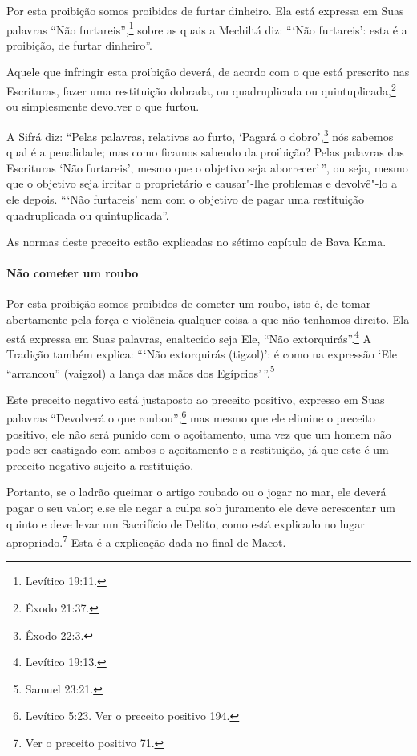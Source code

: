 \begin{multicols}{2}
Por esta proibição somos proibidos de furtar dinheiro. Ela está
expressa em Suas palavras ``Não furtareis'',\footnote{Levítico 19:11.} sobre as
quais a Mechiltá\starr{} diz: ```Não furtareis': esta é a proibição, de furtar
dinheiro''.

Aquele que infringir esta proibição deverá, de acordo com o que está
prescrito nas Escrituras, fazer uma restituição dobrada, ou
quadruplicada ou quintuplicada,\footnote{Êxodo 21:37.} ou simplesmente
devolver o que furtou.

A Sifrá\starr{} diz: ``Pelas palavras, relativas ao furto, `Pagará o dobro',\footnote{Êxodo 22:3.} nós sabemos qual é a penalidade; mas como ficamos sabendo
da proibição? Pelas palavras das Escrituras `Não furtareis', mesmo que
o objetivo seja aborrecer'\,'', ou seja, mesmo que o objetivo seja irritar
o proprietário e causar"-lhe problemas e devolvê"-lo a ele depois. ```Não
furtareis' nem com o objetivo de pagar uma restituição quadruplicada ou
quintuplicada''.

As normas deste preceito estão explicadas no sétimo capítulo de Bava Kama\starr.

\paragraph{Não cometer um roubo}

Por esta proibição somos proibidos de cometer um roubo, isto é, de tomar
abertamente pela força e violência qualquer coisa a que não tenhamos
direito. Ela está expressa em Suas palavras, enaltecido seja Ele, ``Não
extorquirás''.\footnote{Levítico 19:13.} A Tradição também explica: ```Não
extorquirás (tigzol\starr)': é como na expressão `Ele ``arrancou'' (vaigzol\starr{})
a lança das mãos dos Egípcios'\,''.\footnote{ Samuel 23:21.}

Este preceito negativo está justaposto ao preceito positivo, expresso
em Suas palavras ``Devolverá o que roubou'';\footnote{Levítico
5:23. Ver o preceito positivo 194.} mas mesmo que ele elimine o preceito
positivo, ele não será punido com o açoitamento, uma vez que um homem
não pode ser castigado com ambos o açoitamento e a restituição, já que este é um preceito negativo sujeito a restituição.

Portanto, se o ladrão queimar o artigo roubado ou o jogar no mar, ele
deverá pagar o seu valor; e.se ele negar a culpa sob juramento ele deve
acrescentar um quinto e deve levar um Sacrifício de Delito, como está
explicado no lugar apropriado.\footnote{Ver o preceito positivo 71.} Esta é a explicação
dada no final de Macot\starr.


\end{multicols}
